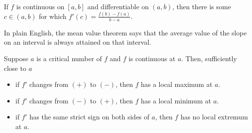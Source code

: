 \begin{thm}
If $f$ is continuous on $[a,b]$ and differentiable on $(a,b)$, then there is some $c\in (a,b)$ for which $f'(c)=\frac{f(b)-f(a)}{b-a}$.
\end{thm}

In plain English, the mean value theorem says that the average value of the slope on an interval is always attained on that interval.















\begin{thm}
Suppose $a$ is a critical number of $f$ and $f$ is continuous at $a$.
Then, sufficiently close to $a$
\begin{itemize}
\item if $f'$ changes from $(+)$ to $(-)$, then $f$ has a local maximum at $a$.
\item if $f'$ changes from $(-)$ to $(+)$, then $f$ has a local minimum at $a$.
\item if $f'$ has the same strict sign on both sides of $a$, then $f$ has no local extremum at $a$.
\end{itemize}
\end{thm}


